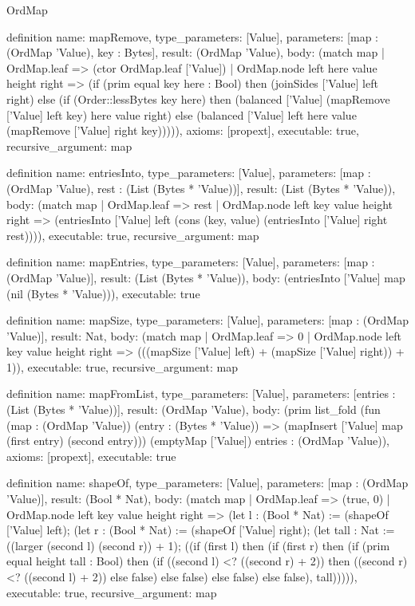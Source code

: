 \begin{lexlean}{OrdMap}
\begin{semanticmodule}
definition{
  name: mapRemove,
  type_parameters: [Value],
  parameters: [map : (OrdMap 'Value), key : Bytes],
  result: (OrdMap 'Value),
  body: (match map
    | OrdMap.leaf => (ctor OrdMap.leaf ['Value])
    | OrdMap.node left here value height right => (if (prim equal key here : Bool) then (joinSides ['Value] left right) else (if (Order::lessBytes key here) then (balanced ['Value] (mapRemove ['Value] left key) here value right) else (balanced ['Value] left here value (mapRemove ['Value] right key))))),
  axioms: [propext],
  executable: true,
  recursive_argument: map
}

definition{
  name: entriesInto,
  type_parameters: [Value],
  parameters: [map : (OrdMap 'Value), rest : (List (Bytes * 'Value))],
  result: (List (Bytes * 'Value)),
  body: (match map
    | OrdMap.leaf => rest
    | OrdMap.node left key value height right => (entriesInto ['Value] left (cons (key, value) (entriesInto ['Value] right rest)))),
  executable: true,
  recursive_argument: map
}

definition{
  name: mapEntries,
  type_parameters: [Value],
  parameters: [map : (OrdMap 'Value)],
  result: (List (Bytes * 'Value)),
  body: (entriesInto ['Value] map (nil (Bytes * 'Value))),
  executable: true
}

definition{
  name: mapSize,
  type_parameters: [Value],
  parameters: [map : (OrdMap 'Value)],
  result: Nat,
  body: (match map
    | OrdMap.leaf => 0
    | OrdMap.node left key value height right => (((mapSize ['Value] left) + (mapSize ['Value] right)) + 1)),
  executable: true,
  recursive_argument: map
}

definition{
  name: mapFromList,
  type_parameters: [Value],
  parameters: [entries : (List (Bytes * 'Value))],
  result: (OrdMap 'Value),
  body: (prim list_fold (fun (map : (OrdMap 'Value)) (entry : (Bytes * 'Value)) => (mapInsert ['Value] map (first entry) (second entry))) (emptyMap ['Value]) entries : (OrdMap 'Value)),
  axioms: [propext],
  executable: true
}

definition{
  name: shapeOf,
  type_parameters: [Value],
  parameters: [map : (OrdMap 'Value)],
  result: (Bool * Nat),
  body: (match map
    | OrdMap.leaf => (true, 0)
    | OrdMap.node left key value height right => (let l : (Bool * Nat) := (shapeOf ['Value] left); (let r : (Bool * Nat) := (shapeOf ['Value] right); (let tall : Nat := ((larger (second l) (second r)) + 1); ((if (first l) then (if (first r) then (if (prim equal height tall : Bool) then (if ((second l) <? ((second r) + 2)) then ((second r) <? ((second l) + 2)) else false) else false) else false) else false), tall))))),
  executable: true,
  recursive_argument: map
}


\end{semanticmodule}
\end{lexlean}
